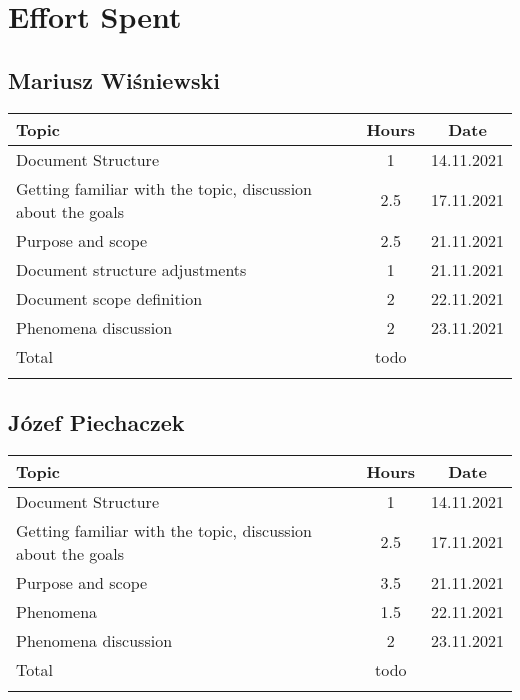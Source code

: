 \chapter{Effort Spent}

\section*{Mariusz Wiśniewski}
\begin{table}[H]
    \centering
    \begin{tabular}{lcc} \Xhline{1.5pt}
        Topic & Hours & Date\\ \hline
        Document Structure & 1 & 14.11.2021\\ 
        Getting familiar with the topic, discussion about the goals & 2.5 & 17.11.2021\\ 
        Purpose and scope & 2.5 & 21.11.2021\\ 
        Document structure adjustments & 1 & 21.11.2021\\
        Document scope definition & 2 & 22.11.2021\\
        Phenomena discussion & 2 & 23.11.2021\\
        \hline
        Total & todo &\\ \Xhline{1.5pt}
    \end{tabular}
\end{table}

\section*{Józef Piechaczek}
\begin{table}[H]
    \centering
    \begin{tabular}{lcc} \Xhline{1.5pt}
        Topic &  Hours & Date \\ \hline
        Document Structure & 1 & 14.11.2021 \\ 
        Getting familiar with the topic, discussion about the goals & 2.5 & 17.11.2021 \\ 
        Purpose and scope & 3.5 & 21.11.2021 \\ 
        Phenomena & 1.5 & 22.11.2021 \\ 
        Phenomena discussion & 2 & 23.11.2021 \\ \hline
        Total &  todo & \\ \Xhline{1.5pt}
    \end{tabular}
\end{table}

